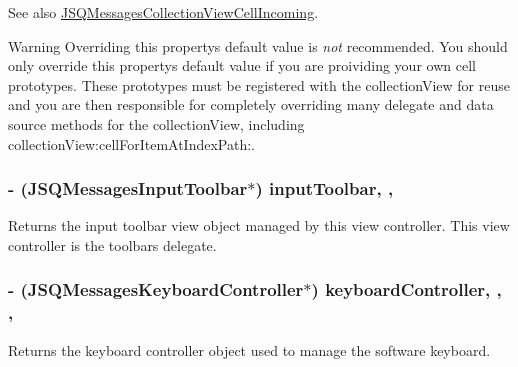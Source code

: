 \begin{DoxySeeAlso}{See also}
\hyperlink{interface_j_s_q_messages_collection_view_cell_incoming}{J\+S\+Q\+Messages\+Collection\+View\+Cell\+Incoming}.
\end{DoxySeeAlso}
\begin{DoxyWarning}{Warning}
Overriding this property\textquotesingle{}s default value is {\itshape not} recommended. You should only override this property\textquotesingle{}s default value if you are proividing your own cell prototypes. These prototypes must be registered with the collection\+View for reuse and you are then responsible for completely overriding many delegate and data source methods for the collection\+View, including {\ttfamily collection\+View\+:cell\+For\+Item\+At\+Index\+Path\+:}. 
\end{DoxyWarning}
\hypertarget{interface_j_s_q_messages_view_controller_adaa2bbc03bed38797ec29d98c3d0c0e0}{}
\subsubsection[{input\+Toolbar}]{\setlength{\rightskip}{0pt plus 5cm}-\/ ({\bf J\+S\+Q\+Messages\+Input\+Toolbar}$\ast$) input\+Toolbar\hspace{0.3cm}{\ttfamily [read]}, {\ttfamily [nonatomic]}, {\ttfamily [weak]}}\label{interface_j_s_q_messages_view_controller_adaa2bbc03bed38797ec29d98c3d0c0e0}
Returns the input toolbar view object managed by this view controller. This view controller is the toolbar\textquotesingle{}s delegate. \hypertarget{interface_j_s_q_messages_view_controller_a5952f0a6cbe8edfc1858109732f3d11b}{}
\subsubsection[{keyboard\+Controller}]{\setlength{\rightskip}{0pt plus 5cm}-\/ ({\bf J\+S\+Q\+Messages\+Keyboard\+Controller}$\ast$) keyboard\+Controller\hspace{0.3cm}{\ttfamily [read]}, {\ttfamily [write]}, {\ttfamily [nonatomic]}, {\ttfamily [strong]}}\label{interface_j_s_q_messages_view_controller_a5952f0a6cbe8edfc1858109732f3d11b}
Returns the keyboard controller object used to manage the software keyboard. \hypertarget{interface_j_s_q_messages_view_controller_af805e4fee4497e23cde6032f2af76aa7}{}
